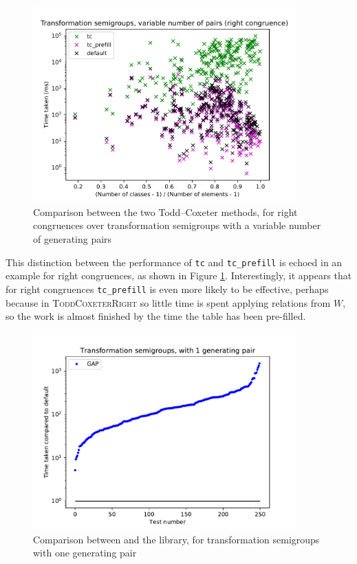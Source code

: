 \begin{figure}[p]
  \centering
  \includegraphics[width=0.9\textwidth]{pics/ch-pairs/bench-trans-tc-vp-right-bynrclasses}
  \caption[Benchmark: Todd--Coxeter, concrete, right, $n$ pairs]
  {Comparison between the two Todd--Coxeter methods, for right
    congruences over transformation semigroups with a variable number of
    generating pairs}
  \label{fig:bench-trans-tc-vp-right-bynrclasses}
\end{figure}

This distinction between the performance of \texttt{tc} and \texttt{tc\_prefill}
is echoed in an example for right congruences, as shown in Figure
\ref{fig:bench-trans-tc-vp-right-bynrclasses}.  Interestingly, it appears that
for right congruences \texttt{tc\_prefill} is even more likely to be effective,
perhaps because in \textsc{ToddCoxeterRight} so little time is spent applying
relations from $W$, so the work is almost finished by the time the table has
been pre-filled.

\begin{figure}[p]
  \centering
  \includegraphics[width=0.9\textwidth]{pics/ch-pairs/bench-trans-1p-gap}
  \caption[Benchmark: \GAP{}/\libsemigroups{}, concrete, 1 pair]
  {Comparison between \libsemigroups{} and the \GAP{} library, for
    transformation semigroups with one generating pair}
  \label{fig:bench-trans-1p-gap}
\end{figure}

